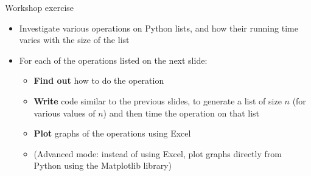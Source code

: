 \begin{frame}{Workshop exercise}
    \begin{itemize}
        \pause\item Investigate various operations on Python lists, and how their running time varies with the size of the list
        \pause\item For each of the operations listed on the next slide:
            \begin{itemize}
                \pause\item \textbf{Find out} how to do the operation
                \pause\item \textbf{Write} code similar to the previous slides, to generate a list of size $n$ (for various values of $n$) and then time the operation on that list
                \pause\item \textbf{Plot} graphs of the operations using Excel
                \pause\item (Advanced mode: instead of using Excel, plot graphs directly from Python using the Matplotlib library)
            \end{itemize}
    \end{itemize}
\end{frame}

